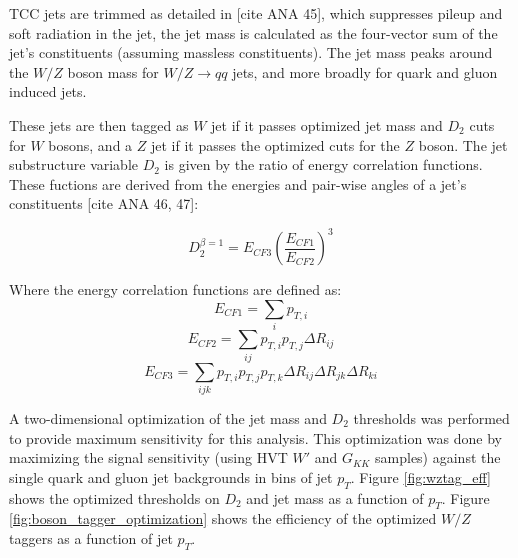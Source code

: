 TCC jets are trimmed as detailed in [cite ANA 45], which suppresses pileup and soft radiation in the jet, the jet mass is calculated as the four-vector sum of the jet's constituents (assuming massless constituents). The jet mass peaks around the $W/Z$ boson mass for $W/Z \rightarrow qq$ jets, and more broadly for quark and gluon induced jets. 

These jets are then tagged as $W$ jet if it passes optimized jet mass and $D_{2}$ cuts for $W$ bosons, and a $Z$ jet if it passes the optimized cuts for the $Z$ boson. The jet substructure variable $D_{2}$ is given by the ratio of energy correlation functions. These fuctions are derived from the energies and pair-wise angles of a jet's constituents [cite ANA 46, 47]:

\begin{equation}
D_{2}^{\beta=1} = E_{CF3}\left(\frac{E_{CF1}}{E_{CF2}}\right)^{3}
\end{equation}

Where the energy correlation functions are defined as:
\begin{equation}
E_{CF1}=\sum_{i}p_{T,i}
\end{equation}
\begin{equation}
E_{CF2}=\sum_{ij}p_{T,i}p_{T,j}\Delta R_{ij}
\end{equation}
\begin{equation}
E_{CF3}=\sum_{ijk}p_{T,i}p_{T,j}p_{T,k}\Delta R_{ij}\Delta R_{jk}\Delta R_{ki}
\end{equation}

A two-dimensional optimization of the jet mass and $D_{2}$ thresholds was performed to provide maximum sensitivity for this analysis. This optimization was done by maximizing the signal sensitivity (using  HVT $W'$ and $G_{KK}$ samples) against the single quark and gluon jet backgrounds in bins of jet $p_{T}$.  Figure \ref{fig:wztag_eff} shows the optimized thresholds on $D_{2}$ and jet mass as a function of $p_{T}$. Figure \ref{fig:boson_tagger_optimization} shows the efficiency of the optimized $W/Z$ taggers as a function of jet $p_{T}$. 


